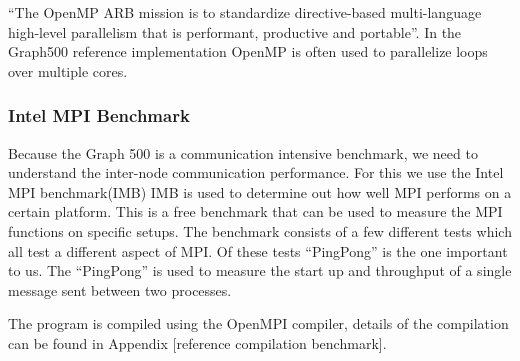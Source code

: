 ``The OpenMP ARB mission is to standardize directive-based multi-language high-level parallelism that is performant, productive and portable''\cite{openmp}. In the Graph500 reference implementation OpenMP is often used to parallelize loops over multiple cores. 


\subsubsection{Intel MPI Benchmark}
\label{tools-imb}
Because the Graph 500 is a communication intensive benchmark, we need to understand the inter-node communication performance. For this we use the Intel MPI benchmark(IMB)  
IMB is used to determine out how well MPI performs on a certain platform. This is a free benchmark that can be used to measure the MPI functions on specific setups. The benchmark consists of a few different tests which all test a different aspect of MPI. Of these tests ``PingPong'' is the one important to us. The ``PingPong'' is used to measure the start up and throughput of a single message sent between two processes\cite{img-userguide}.

 The program is compiled using the OpenMPI compiler, details of the compilation can be found in Appendix [reference compilation benchmark].

